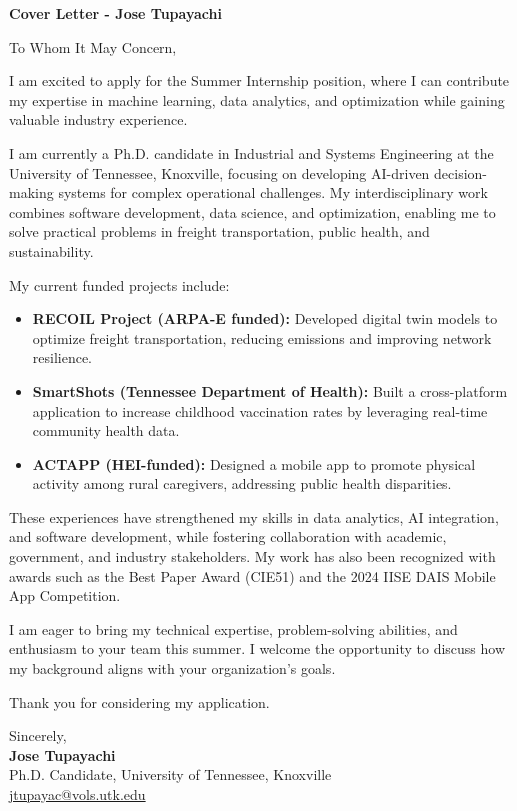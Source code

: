 \documentclass[10pt, letterpaper]{article}
\begin{document}
\begin{center}
    \textbf{\Large Cover Letter - Jose Tupayachi}
\end{center}
\vspace{1cm}  %

To Whom It May Concern,

I am excited to apply for the Summer Internship position, where I can contribute my expertise in machine learning, data analytics, and optimization while gaining valuable industry experience.

I am currently a Ph.D. candidate in Industrial and Systems Engineering at the University of Tennessee, Knoxville, focusing on developing AI-driven decision-making systems for complex operational challenges. My interdisciplinary work combines software development, data science, and optimization, enabling me to solve practical problems in freight transportation, public health, and sustainability.

My current funded projects include:
\begin{itemize}
    \item \textbf{RECOIL Project (ARPA-E funded):} Developed digital twin models to optimize freight transportation, reducing emissions and improving network resilience.
    \item \textbf{SmartShots (Tennessee Department of Health):} Built a cross-platform application to increase childhood vaccination rates by leveraging real-time community health data.
    \item \textbf{ACTAPP (HEI-funded):} Designed a mobile app to promote physical activity among rural caregivers, addressing public health disparities.
\end{itemize}

These experiences have strengthened my skills in data analytics, AI integration, and software development, while fostering collaboration with academic, government, and industry stakeholders. My work has also been recognized with awards such as the Best Paper Award (CIE51) and the 2024 IISE DAIS Mobile App Competition.

I am eager to bring my technical expertise, problem-solving abilities, and enthusiasm to your team this summer. I welcome the opportunity to discuss how my background aligns with your organization's goals.

Thank you for considering my application.

Sincerely,\\
\textbf{Jose Tupayachi}\\
Ph.D. Candidate, University of Tennessee, Knoxville\\
\href{mailto:jtupayac@vols.utk.edu}{jtupayac@vols.utk.edu} 
\end{document}
